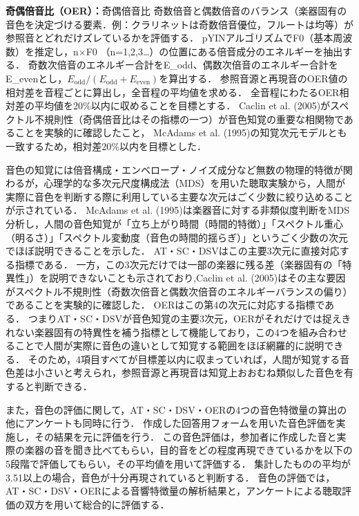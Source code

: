 \documentclass[lualatex,book,openany,paper=a4paper,jafontsize=11.5pt,jafontscale=1.05]{jlreq}
\begin{document}
\begin{itemize}
    \textbf{奇偶倍音比（OER）：}奇偶倍音比
    奇数倍音と偶数倍音のバランス（楽器固有の音色を決定づける要素．例：クラリネットは奇数倍音優位，フルートは均等）が参照音とどれだけズレているかを評価する．
    pYINアルゴリズム\cite{pyin}でF0（基本周波数）を推定し，n$\times$F0 （n=1,2,3…）の位置にある倍音成分のエネルギーを抽出する．
    奇数次倍音のエネルギー合計をE\_odd、偶数次倍音のエネルギー合計をE\_evenとし，$E_{\mathrm{odd}}/(E_{\mathrm{odd}}+E_{\mathrm{even}})$を算出する．
    参照音源と再現音のOER値の相対差を音程ごとに算出し，全音程の平均値を求める．
    全音程にわたるOER相対差の平均値を20\%以内に収めることを目標とする．
    Caclin et al. (2005)がスペクトル不規則性（奇偶倍音比はその指標の一つ）が音色知覚の重要な相関物であることを実験的に確認した\cite{Caclin}こと，
    McAdams et al. (1995)の知覚次元モデルとも一致するため，相対差20\%以内を目標とした\cite{McAdams}．


\end{itemize}

音色の知覚には倍音構成・エンベロープ・ノイズ成分など無数の物理的特徴が関わるが，心理学的な多次元尺度構成法（MDS）を用いた聴取実験から，人間が実際に音色を判断する際に利用している主要な次元はごく少数に絞り込めることが示されている．
McAdams et al. (1995)は楽器音に対する非類似度判断をMDS分析し，人間の音色知覚が「立ち上がり時間（時間的特徴）」「スペクトル重心（明るさ）」「スペクトル変動度（音色の時間的揺らぎ）」というごく少数の次元でほぼ説明できることを示した\cite{McAdams}．
AT・SC・DSVはこの主要3次元に直接対応する指標である．
一方，この3次元だけでは一部の楽器に残る差（楽器固有の「特異性」）を説明できないことも示されており,Caclin et al. (2005)はその主な要因がスペクトル不規則性（奇数次倍音と偶数次倍音のエネルギーバランスの偏り）であることを実験的に確認した\cite{Caclin}．
OERはこの第4の次元に対応する指標である．
つまりAT・SC・DSVが音色知覚の主要3次元，OERがそれだけでは捉えきれない楽器固有の特異性を補う指標として機能しており，この4つを組み合わせることで人間が実際に音色の違いとして知覚する範囲をほぼ網羅的に説明できる．
そのため，4項目すべてが目標差以内に収まっていれば，人間が知覚する音色差は小さいと考えられ，参照音源と再現音は知覚上おおむね類似した音色を有すると判断できる．

また，音色の評価に関して，AT・SC・DSV・OERの4つの音色特徴量の算出の他にアンケートも同時に行う．
作成した回答用フォームを用いた音色評価を実施し，その結果を元に評価を行う．
この音色評価は，参加者に作成した音と実際の楽器の音を聞き比べてもらい，目的音をどの程度再現できているかを以下の5段階で評価してもらい，その平均値を用いて評価する．
集計したものの平均が3.51以上の場合，音色が十分再現されていると判断する．
音色の評価では，AT・SC・DSV・OERによる音響特徴量の解析結果と，アンケートによる聴取評価の双方を用いて総合的に評価する．
\end{document}
